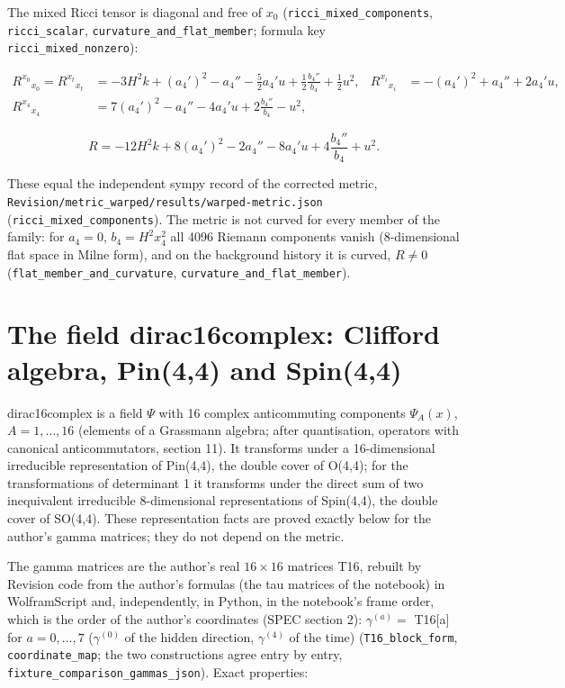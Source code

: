 \documentclass[11pt]{article}
\begin{document}
The mixed Ricci tensor is diagonal and free of $x_0$ (\texttt{ricci\_mi\allowbreak{}xed\_comp\allowbreak{}onents}, \texttt{ricci\_sc\allowbreak{}alar}, \texttt{curvatur\allowbreak{}e\_and\_fl\allowbreak{}at\_membe\allowbreak{}r}; formula key \texttt{ricci\_mi\allowbreak{}xed\_nonz\allowbreak{}ero}):

\[
\begin{aligned}
R^{x_0}{}_{x_0} = R^{x_t}{}_{x_t} &= -3H^2k + (a_4')^2 - a_4'' - \tfrac52a_4'u + \tfrac12\frac{b_4''}{b_4} + \tfrac12u^2, & R^{x_i}{}_{x_i} &= -(a_4')^2 + a_4'' + 2a_4'u, \\
R^{x_4}{}_{x_4} &= 7(a_4')^2 - a_4'' - 4a_4'u + 2\frac{b_4''}{b_4} - u^2,
\end{aligned}
\]

\[
R = -12H^2k + 8(a_4')^2 - 2a_4'' - 8a_4'u + 4\frac{b_4''}{b_4} + u^2 .
\]

These equal the independent sympy record of the corrected metric, \texttt{Revision\allowbreak{}/metric\_\allowbreak{}warped/r\allowbreak{}esults/w\allowbreak{}arped-me\allowbreak{}tric.jso\allowbreak{}n} (\texttt{ricci\_mi\allowbreak{}xed\_comp\allowbreak{}onents}). The metric is not curved for every member of the family: for $a_4 = 0$, $b_4 = H^2x_4^2$ all 4096 Riemann components vanish (8-dimensional flat space in Milne form), and on the background history it is curved, $R \neq 0$ (\texttt{flat\_mem\allowbreak{}ber\_and\_\allowbreak{}curvatur\allowbreak{}e}, \texttt{curvatur\allowbreak{}e\_and\_fl\allowbreak{}at\_membe\allowbreak{}r}).

\section{The field dirac16complex: Clifford algebra, Pin(4,4) and Spin(4,4)}

dirac16complex is a field $\Psi$ with 16 complex anticommuting components $\Psi_A(x)$, $A = 1, \dots, 16$ (elements of a Grassmann algebra; after quantisation, operators with canonical anticommutators, section 11). It transforms under a 16-dimensional irreducible representation of Pin(4,4), the double cover of O(4,4); for the transformations of determinant 1 it transforms under the direct sum of two inequivalent irreducible 8-dimensional representations of Spin(4,4), the double cover of SO(4,4). These representation facts are proved exactly below for the author's gamma matrices; they do not depend on the metric.

The gamma matrices are the author's real $16\times16$ matrices T16, rebuilt by Revision code from the author's formulas (the tau matrices of the notebook) in WolframScript and, independently, in Python, in the notebook's frame order, which is the order of the author's coordinates (SPEC section 2): $\gamma^{(a)} = $ T16[a] for $a = 0, \dots, 7$ ($\gamma^{(0)}$ of the hidden direction, $\gamma^{(4)}$ of the time) (\texttt{T16\_bloc\allowbreak{}k\_form}, \texttt{coordina\allowbreak{}te\_map}; the two constructions agree entry by entry, \texttt{fixture\_\allowbreak{}comparis\allowbreak{}on\_gamma\allowbreak{}s\_json}). Exact properties:
\end{document}
